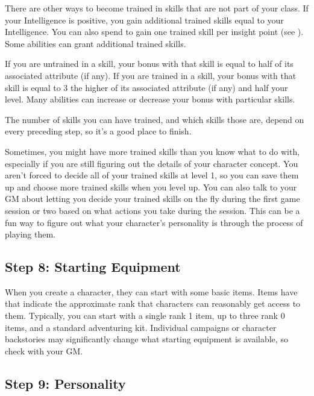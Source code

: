         There are other ways to become trained in skills that are not part of your class.
        If your Intelligence is positive, you gain additional trained skills equal to your Intelligence.
        You can also spend  to gain one trained skill per insight point (see ).
        Some abilities can grant additional trained skills.

        If you are untrained in a skill, your bonus with that skill is equal to half of its associated attribute (if any).
        If you are trained in a skill, your bonus with that skill is equal to 3 \add the higher of its associated attribute (if any) and half your level.
        Many abilities can increase or decrease your bonus with particular skills.

        The number of skills you can have trained, and which skills those are, depend on every preceding step, so it's a good place to finish.

        Sometimes, you might have more trained skills than you know what to do with, especially if you are still figuring out the details of your character concept.
        You aren't forced to decide all of your trained skills at level 1, so you can save them up and choose more trained skills when you level up.
        You can also talk to your GM about letting you decide your trained skills on the fly during the first game session or two based on what actions you take during the session.
        This can be a fun way to figure out what your character's personality is through the process of playing them.

    \subsection{Step 8: Starting Equipment}
        When you create a character, they can start with some basic items.
        Items have  that indicate the approximate rank that characters can reasonably get access to them.
        Typically, you can start with a single rank 1 item, up to three rank 0 items, and a standard adventuring kit.
        Individual campaigns or character backstories may significantly change what starting equipment is available, so check with your GM.

    \subsection{Step 9: Personality}

